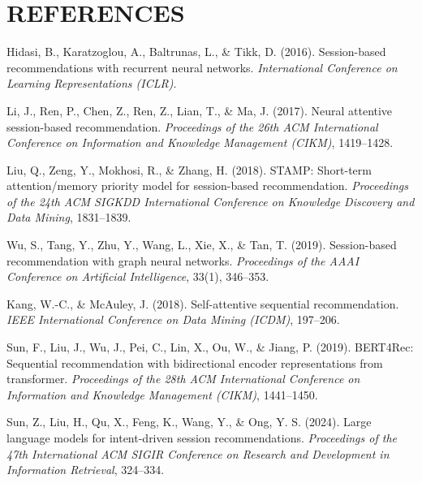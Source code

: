 \documentclass[12pt,a4paper,oneside]{report}
\begin{document}
\chapter*{REFERENCES}

\begin{enumerate}[label={[\arabic*]},leftmargin=*,itemsep=6pt]

\item Hidasi, B., Karatzoglou, A., Baltrunas, L., \& Tikk, D. (2016).
Session-based recommendations with recurrent neural networks. \emph{International
Conference on Learning Representations (ICLR)}.

\item Li, J., Ren, P., Chen, Z., Ren, Z., Lian, T., \& Ma, J. (2017). Neural
attentive session-based recommendation. \emph{Proceedings of the 26th ACM
International Conference on Information and Knowledge Management (CIKM)},
1419--1428.

\item Liu, Q., Zeng, Y., Mokhosi, R., \& Zhang, H. (2018). STAMP: Short-term
attention/memory priority model for session-based recommendation.
\emph{Proceedings of the 24th ACM SIGKDD International Conference on Knowledge
Discovery and Data Mining}, 1831--1839.

\item Wu, S., Tang, Y., Zhu, Y., Wang, L., Xie, X., \& Tan, T. (2019).
Session-based recommendation with graph neural networks. \emph{Proceedings of the
AAAI Conference on Artificial Intelligence}, 33(1), 346--353.

\item Kang, W.-C., \& McAuley, J. (2018). Self-attentive sequential
recommendation. \emph{IEEE International Conference on Data Mining (ICDM)},
197--206.

\item Sun, F., Liu, J., Wu, J., Pei, C., Lin, X., Ou, W., \& Jiang, P. (2019).
BERT4Rec: Sequential recommendation with bidirectional encoder representations
from transformer. \emph{Proceedings of the 28th ACM International Conference on
Information and Knowledge Management (CIKM)}, 1441--1450.

\item Sun, Z., Liu, H., Qu, X., Feng, K., Wang, Y., \& Ong, Y. S. (2024). Large
language models for intent-driven session recommendations. \emph{Proceedings of
the 47th International ACM SIGIR Conference on Research and Development in
Information Retrieval}, 324--334.


\end{enumerate}
\end{document}
